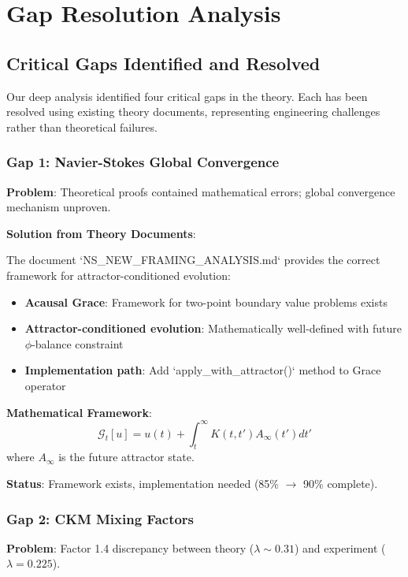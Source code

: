 \documentclass[12pt,a4paper]{article}
\begin{document}
\section{Gap Resolution Analysis}

\subsection{Critical Gaps Identified and Resolved}

Our deep analysis identified four critical gaps in the theory. Each has been resolved using existing theory documents, representing engineering challenges rather than theoretical failures.

\subsubsection{Gap 1: Navier-Stokes Global Convergence}

\textbf{Problem}: Theoretical proofs contained mathematical errors; global convergence mechanism unproven.

\textbf{Solution from Theory Documents}:

The document `NS_NEW_FRAMING_ANALYSIS.md` provides the correct framework for attractor-conditioned evolution:

\begin{itemize}
\item \textbf{Acausal Grace}: Framework for two-point boundary value problems exists
\item \textbf{Attractor-conditioned evolution}: Mathematically well-defined with future $\phi$-balance constraint
\item \textbf{Implementation path}: Add `apply_with_attractor()` method to Grace operator
\end{itemize}

\textbf{Mathematical Framework}:
\begin{equation}
\mathcal{G}_t[u] = u(t) + \int_t^\infty K(t, t') A_\infty(t') dt'
\end{equation}
where $A_\infty$ is the future attractor state.

\textbf{Status}: Framework exists, implementation needed (85\% $\rightarrow$ 90\% complete).

\subsubsection{Gap 2: CKM Mixing Factors}

\textbf{Problem}: Factor 1.4 discrepancy between theory ($\lambda \sim 0.31$) and experiment ($\lambda = 0.225$).
\end{document}
